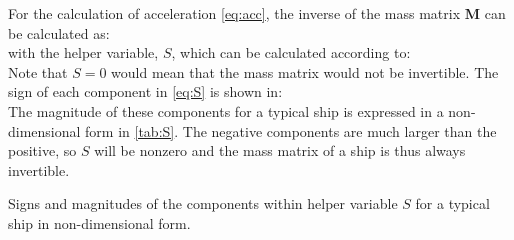 For the calculation of acceleration \autoref{eq:acc}, the inverse of the mass matrix $\mathbf{M}$ can be calculated as:
\begin{equation}
    \label{eq:M_inv}
    
\end{equation}
with the helper variable, $S$, which can be calculated according to: 
\begin{equation}
    \label{eq:S}
    
\end{equation}
Note that $S=0$ would mean that the mass matrix would not be invertible. The sign of each component in \autoref{eq:S} is shown in:
\begin{equation}
    \label{eq:S_sign}
    
\end{equation}
The magnitude of these components for a typical ship is expressed in a non-dimensional form in \autoref{tab:S}. The negative components are much larger than the positive, so $S$ will be nonzero and the mass matrix of a ship is thus always invertible.      
\begin{table}[h]
    \centering
    \small
    \caption{Signs and magnitudes of the components within helper variable $S$ for a typical ship in non-dimensional form.}
    \label{tab:S}
\end{table}
\FloatBarrier
